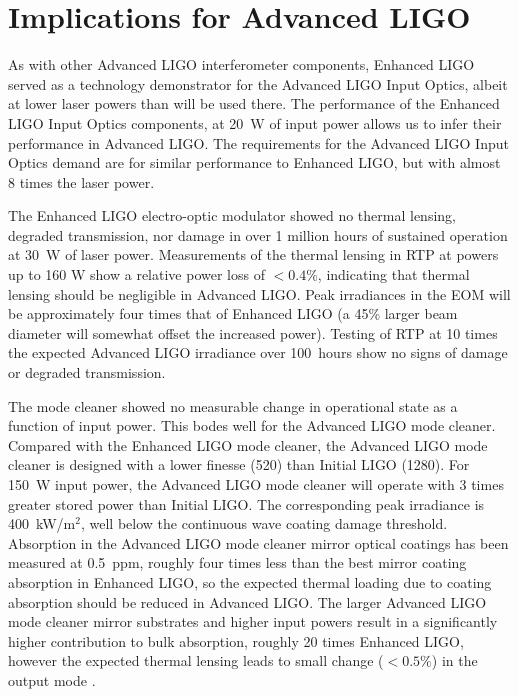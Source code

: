 \section{Implications for Advanced LIGO}
\label{sec:aLIGO}
As with other Advanced LIGO interferometer components, Enhanced LIGO
served as a technology demonstrator for the Advanced LIGO Input
Optics, albeit at lower laser powers than will be used there. The
performance of the Enhanced LIGO Input Optics components, at 20~W of
input power allows us to infer their performance in Advanced LIGO.
The requirements for the Advanced LIGO Input Optics demand are for
similar performance to Enhanced LIGO, but with almost 8 times the
laser power.

The Enhanced LIGO electro-optic modulator showed no thermal lensing,
degraded transmission, nor damage in over 1 million hours of sustained
operation at 30~W of laser power. Measurements of the thermal lensing
in RTP at powers up to 160 W show a relative power loss of $< 0.4\%$,
indicating that thermal lensing should be negligible in Advanced LIGO.
Peak irradiances in the EOM will be approximately four times that of
Enhanced LIGO (a 45\% larger beam diameter will somewhat offset the
increased power).  Testing of RTP at 10 times the expected Advanced
LIGO irradiance over 100~hours show no signs of damage or degraded
transmission.

The mode cleaner showed no measurable change in operational state as a
function of input power.  This bodes well for the Advanced LIGO mode
cleaner.  Compared with the Enhanced LIGO mode cleaner, the Advanced
LIGO mode cleaner is designed with a lower finesse (520) than Initial
LIGO (1280).  For 150~W input power, the Advanced LIGO mode cleaner
will operate with 3 times greater stored power than Initial LIGO.  The
corresponding peak irradiance is 400~kW/m$^2$, well below the
continuous wave coating damage threshold.  Absorption in the Advanced
LIGO mode cleaner mirror optical coatings has been measured at
0.5~ppm, roughly four times less than the best mirror coating
absorption in Enhanced LIGO, so the expected thermal loading due to
coating absorption should be reduced in Advanced LIGO.  The larger
Advanced LIGO mode cleaner mirror substrates and higher input powers
result in a significantly higher contribution to bulk absorption,
roughly 20 times Enhanced LIGO, however the expected thermal lensing
leads to small change ($< 0.5 \%$) in the output mode
\citep{Arain2007Note}.

